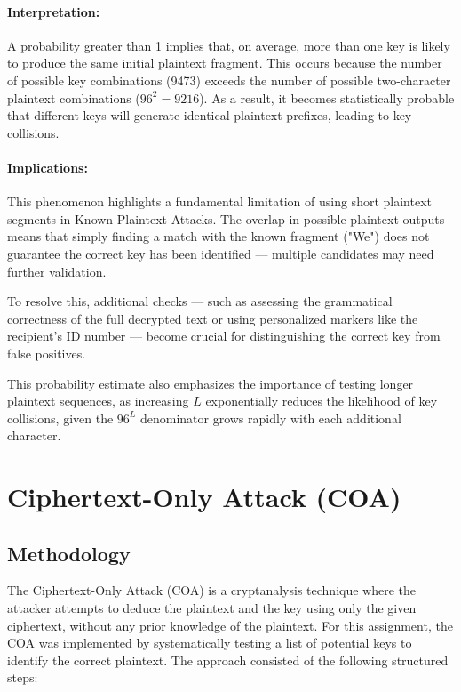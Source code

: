 \documentclass{article}
\begin{document}
\paragraph{Interpretation:}
A probability greater than 1 implies that, on average, more than one key is likely to produce the same initial plaintext fragment. This occurs because the number of possible key combinations (9473) exceeds the number of possible two-character plaintext combinations (\( 96^2 = 9216 \)). As a result, it becomes statistically probable that different keys will generate identical plaintext prefixes, leading to key collisions.

\paragraph{Implications:}
This phenomenon highlights a fundamental limitation of using short plaintext segments in Known Plaintext Attacks. The overlap in possible plaintext outputs means that simply finding a match with the known fragment ("We") does not guarantee the correct key has been identified — multiple candidates may need further validation. 

To resolve this, additional checks — such as assessing the grammatical correctness of the full decrypted text or using personalized markers like the recipient's ID number — become crucial for distinguishing the correct key from false positives.

This probability estimate also emphasizes the importance of testing longer plaintext sequences, as increasing \( L \) exponentially reduces the likelihood of key collisions, given the \( 96^L \) denominator grows rapidly with each additional character.



\section{Ciphertext-Only Attack (COA)}

\subsection{Methodology}
The Ciphertext-Only Attack (COA) is a cryptanalysis technique where the attacker attempts to deduce the plaintext and the key using only the given ciphertext, without any prior knowledge of the plaintext. For this assignment, the COA was implemented by systematically testing a list of potential keys to identify the correct plaintext. The approach consisted of the following structured steps:
\end{document}
